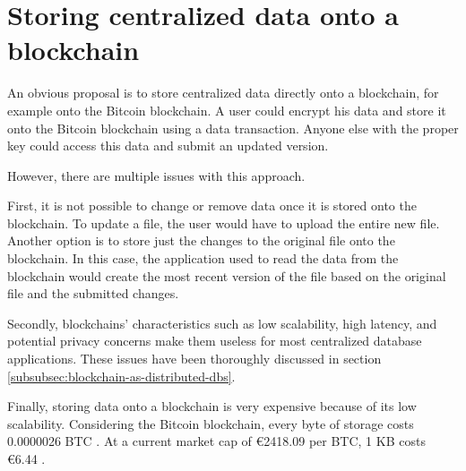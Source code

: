 \section{Storing centralized data onto a blockchain}
\label{store-on-Bitcoin}

\iffalse
- very obvious solution would be to store data directly onto a blockchain, eg. the Bitcoin blockchain. you would just put all the data, properly encrypted, directly onto the blockchain and it is stored

\fi

An obvious proposal is to store centralized data directly onto a blockchain, for example onto the Bitcoin blockchain. A user could encrypt his data and store it onto the Bitcoin blockchain using a data transaction. Anyone else with the proper key could access this data and submit an updated version.

\iffalse
- various issues arise: 
  - basic functionality is missing that several applications need: you are not able to change or remove data once stored data, to update a file you would have to store the entire file again or store just the change and have your application reading the blockchain create the most recent file.
  - as mentioned in section \ref{subsubsec:blockchain-as-distributed-dbs}, blockchains deal with low scalability, high latency and potential privacy concerns.
  - insanely expensive: 0.0000026 BTC per byte \cite{Bitcoin-transaction-fee}. At a current market cap of €2418.09 per BTC, the cost of storage is €6.44 per KB. \cite{Bitcoin-market-cap}
\fi

However, there are multiple issues with this approach. 

First, it is not possible to change or remove data once it is stored onto the blockchain. To update a file, the user would have to upload the entire new file. Another option is to store just the changes to the original file onto the blockchain. In this case, the application used to read the data from the blockchain would create the most recent version of the file based on the original file and the submitted changes. 

Secondly, blockchains' characteristics such as low scalability, high latency, and potential privacy concerns make them useless for most centralized database applications. These issues have been thoroughly discussed in section \ref{subsubsec:blockchain-as-distributed-dbs}.

Finally, storing data onto a blockchain is very expensive because of its low scalability. Considering the Bitcoin blockchain, every byte of storage costs 0.0000026 BTC \cite{Bitcoin-transaction-fee}. At a current market cap of \euro 2418.09 per BTC, 1 KB costs \euro 6.44 \cite{Bitcoin-market-cap}.

